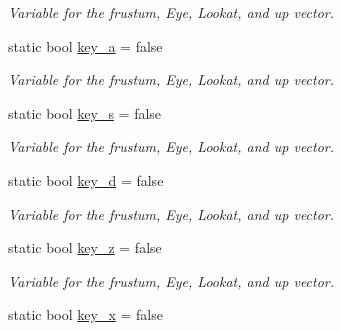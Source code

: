 \begin{DoxyCompactItemize}
\begin{DoxyCompactList}\small\item\em Variable for the frustum, Eye, Lookat, and up vector. \end{DoxyCompactList}\item 
static bool \hyperlink{classcft_1_1Scene_afdb2bbadde24b50b93347ca93954485f}{key\+\_\+a} = false\hypertarget{classcft_1_1Scene_afdb2bbadde24b50b93347ca93954485f}{}\label{classcft_1_1Scene_afdb2bbadde24b50b93347ca93954485f}

\begin{DoxyCompactList}\small\item\em Variable for the frustum, Eye, Lookat, and up vector. \end{DoxyCompactList}\item 
static bool \hyperlink{classcft_1_1Scene_a1d9c8a2ca27e0789f5eef6f5a5ef822f}{key\+\_\+s} = false\hypertarget{classcft_1_1Scene_a1d9c8a2ca27e0789f5eef6f5a5ef822f}{}\label{classcft_1_1Scene_a1d9c8a2ca27e0789f5eef6f5a5ef822f}

\begin{DoxyCompactList}\small\item\em Variable for the frustum, Eye, Lookat, and up vector. \end{DoxyCompactList}\item 
static bool \hyperlink{classcft_1_1Scene_a556673b51bac7161bb9b4a2c8c1d4883}{key\+\_\+d} = false\hypertarget{classcft_1_1Scene_a556673b51bac7161bb9b4a2c8c1d4883}{}\label{classcft_1_1Scene_a556673b51bac7161bb9b4a2c8c1d4883}

\begin{DoxyCompactList}\small\item\em Variable for the frustum, Eye, Lookat, and up vector. \end{DoxyCompactList}\item 
static bool \hyperlink{classcft_1_1Scene_ac30ebecf44c9e90211547758484eff17}{key\+\_\+z} = false\hypertarget{classcft_1_1Scene_ac30ebecf44c9e90211547758484eff17}{}\label{classcft_1_1Scene_ac30ebecf44c9e90211547758484eff17}

\begin{DoxyCompactList}\small\item\em Variable for the frustum, Eye, Lookat, and up vector. \end{DoxyCompactList}\item 
static bool \hyperlink{classcft_1_1Scene_a207a97d3447062efe5e4bee1b8183621}{key\+\_\+x} = false\hypertarget{classcft_1_1Scene_a207a97d3447062efe5e4bee1b8183621}{}\label{classcft_1_1Scene_a207a97d3447062efe5e4bee1b8183621}


\end{DoxyCompactItemize}
